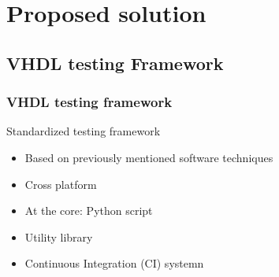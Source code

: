 \documentclass[british,10pt]{beamer}
\begin{document}
%


\section{Proposed solution}

\subsection{VHDL testing Framework}

\begin{frame}\frametitle{VHDL testing framework}
Standardized testing framework
\begin{itemize}
\item Based on previously mentioned software techniques
\item Cross platform
\item At the core: Python script
\item Utility library
\item Continuous Integration (CI) systemn
\end{itemize}
\end{frame}
\end{document}

